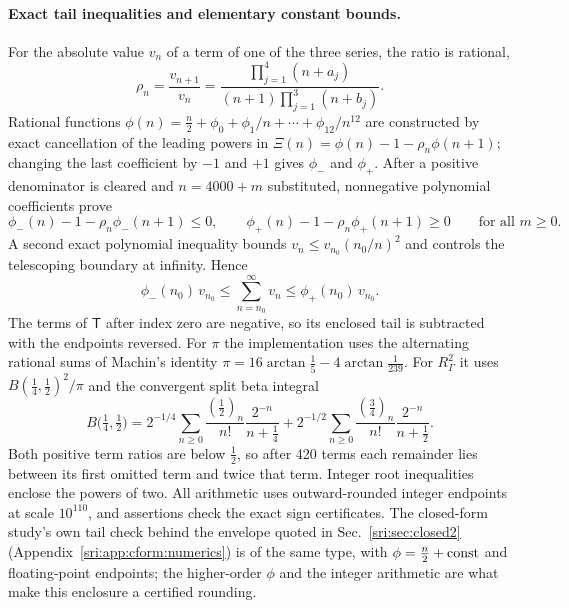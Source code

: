 \paragraph{Exact tail inequalities and elementary constant bounds.} For the absolute value $v_n$ of a term of one of
the three series, the ratio is rational,
\begin{equation}
 \rho_n=\frac{v_{n+1}}{v_n}=\frac{\prod_{j=1}^4(n+a_j)}{(n+1)\prod_{j=1}^3(n+b_j)}.
\end{equation}
Rational functions $\phi(n)=\frac n2+\phi_0+\phi_1/n+\cdots+\phi_{12}/n^{12}$ are constructed by exact cancellation of
the leading powers in $\Xi(n)=\phi(n)-1-\rho_n\phi(n+1)$; changing the last coefficient by $-1$ and $+1$ gives $\phi_-$
and $\phi_+$. After a positive denominator is cleared and $n=4000+m$ substituted, nonnegative polynomial coefficients
prove
\begin{equation}
 \phi_-(n)-1-\rho_n\phi_-(n+1)\le0,\qquad \phi_+(n)-1-\rho_n\phi_+(n+1)\ge0\qquad\text{for all }m\ge0.
\end{equation}
A second exact polynomial inequality bounds $v_n\le v_{n_0}(n_0/n)^2$ and controls the telescoping boundary at
infinity. Hence
\begin{equation}
 \phi_-(n_0)\,v_{n_0}\le\sum_{n=n_0}^\infty v_n\le\phi_+(n_0)\,v_{n_0}.
\end{equation}
The terms of $\mathsf T$ after index zero are negative, so its enclosed tail is subtracted with the endpoints reversed.
For $\pi$ the implementation uses the alternating rational sums of Machin's identity
$\pi=16\arctan\frac15-4\arctan\frac1{239}$. For $R_\Gamma^2$ it uses $B(\frac14,\frac12)^2/\pi$ and the convergent split
beta integral
\begin{equation}
 B\bigl(\tfrac14,\tfrac12\bigr)=2^{-1/4}\sum_{n\ge0}\frac{(\frac12)_n}{n!}\frac{2^{-n}}{n+\frac14}
 +2^{-1/2}\sum_{n\ge0}\frac{(\frac34)_n}{n!}\frac{2^{-n}}{n+\frac12}.
\end{equation}
Both positive term ratios are below $\frac12$, so after 420 terms each remainder lies between its first omitted term and
twice that term. Integer root inequalities enclose the powers of two. All arithmetic uses outward-rounded integer
endpoints at scale $10^{110}$, and assertions check the exact sign certificates. The closed-form study's own tail check behind the envelope quoted in Sec.~\ref{sri:sec:closed2} (Appendix~\ref{sri:app:cform:numerics}) is of the same
type, with $\phi=\frac n2+{\rm const}$ and floating-point endpoints; the higher-order $\phi$ and the integer arithmetic
are what make this enclosure a certified rounding.

